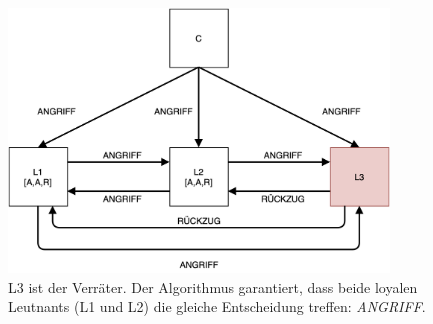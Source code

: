 \documentclass{article}
\begin{document}
\begin{figure}[H]
    \centering
    \includegraphics[width=0.9\textwidth]{omalgo.png}
    \caption{L3 ist der Verräter. Der Algorithmus garantiert, dass beide loyalen Leutnants (L1 und L2) die gleiche Entscheidung treffen: \textit{ANGRIFF}. }
    \label{fig:OMAlgorithm}
\end{figure}

\end{document}
